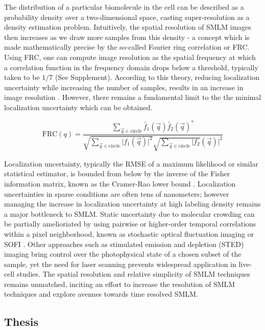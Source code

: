 The distribution of a particular biomolecule in the cell can be described as a probability density over a two-dimensional space, casting super-resolution as a density estimation problem. Intuitively, the spatial resolution of SMLM images then increases as we draw more samples from this density - a concept which is made mathematically precise by the so-called Fourier ring correlation or FRC. Using FRC, one can compute image resolution as the spatial frequency at which a correlation function in the frequency domain drops below a threshold, typically taken to be $1/7$ (See Supplement). According to this theory, reducing localization uncertainty while increasing the number of samples, results in an increase in image resolution \parencite{Nieuwenhuizen2013}. However, there remains a fundamental limit to the the minimal localization uncertainty which can be obtained.


\begin{equation*}
\mathrm{FRC}(q) = \frac{\sum_{\vec{q}\in\mathrm{circle}}\tilde{f_{1}}(\vec{q})\tilde{f_{2}}(\vec{q})^{*}}{\sqrt{\sum_{\vec{q}\in\mathrm{circle}}\lvert f_{1}(\vec{q})\lvert^{2}}\sqrt{\sum_{\vec{q}\in\mathrm{circle}}\lvert f_{2}}(\vec{q})\lvert^{2}}
\end{equation*}


Localization uncertainty, typically the RMSE of a maximum likelihood or similar statistical estimator, is bounded from below by the inverse of the Fisher information matrix, known as the Cramer-Rao lower bound \parencite{Chao2016}. Localization uncertainties in sparse conditions are often tens of nanometers; however managing the increase in localization uncertainty at high labeling density remains a major bottleneck to SMLM. Static uncertainty due to molecular crowding can be partially amelioriated by using pairwise or higher-order temporal correlations within a pixel neighborhood, known as stochastic optical fluctuation imaging or SOFI \parencite{Dertinger2009}. Other approaches such as stimulated emission and depletion (STED) imaging bring control over the photophysical state of a chosen subset of the sample, yet the need for laser scanning prevents widespread application in live-cell studies. The spatial resolution and relative simplicity of SMLM techniques remains unmatched, inciting an effort to increase the resolution of SMLM techniques and explore avenues towards time resolved SMLM.

\subsection{Thesis}

